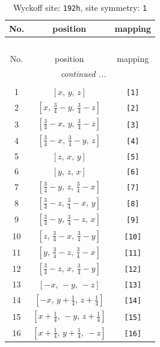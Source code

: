 \documentclass[fleqn,8pt]{jsarticle}
\begin{document}
\begin{longtable}{ccc}
\caption{Wyckoff site: {\tt 192h}, site symmetry: {\tt 1}}
 \\
 \hline \hline
No. & position & mapping \\ \hline \endfirsthead

\multicolumn{2}{l}{\tablename\ \thetable{}} \\
 \hline \hline
No. & position & mapping \\ \hline \endhead

 \hline \hline
\multicolumn{2}{r}{\footnotesize\it continued ...} \\ \endfoot

 \hline \hline
\multicolumn{2}{r}{} \\ \endlastfoot

1 & $\left[ x,\, y,\, z \right]$ & {\tt [1]} \\ \hline
2 & $\left[ x,\, \frac{3}{4} - y,\, \frac{3}{4} - z \right]$ & {\tt [2]} \\ \hline
3 & $\left[ \frac{3}{4} - x,\, y,\, \frac{3}{4} - z \right]$ & {\tt [3]} \\ \hline
4 & $\left[ \frac{3}{4} - x,\, \frac{3}{4} - y,\, z \right]$ & {\tt [4]} \\ \hline
5 & $\left[ z,\, x,\, y \right]$ & {\tt [5]} \\ \hline
6 & $\left[ y,\, z,\, x \right]$ & {\tt [6]} \\ \hline
7 & $\left[ \frac{3}{4} - y,\, z,\, \frac{3}{4} - x \right]$ & {\tt [7]} \\ \hline
8 & $\left[ \frac{3}{4} - z,\, \frac{3}{4} - x,\, y \right]$ & {\tt [8]} \\ \hline
9 & $\left[ \frac{3}{4} - y,\, \frac{3}{4} - z,\, x \right]$ & {\tt [9]} \\ \hline
10 & $\left[ z,\, \frac{3}{4} - x,\, \frac{3}{4} - y \right]$ & {\tt [10]} \\ \hline
11 & $\left[ y,\, \frac{3}{4} - z,\, \frac{3}{4} - x \right]$ & {\tt [11]} \\ \hline
12 & $\left[ \frac{3}{4} - z,\, x,\, \frac{3}{4} - y \right]$ & {\tt [12]} \\ \hline
13 & $\left[ - x,\, - y,\, - z \right]$ & {\tt [13]} \\ \hline
14 & $\left[ - x,\, y + \frac{1}{4},\, z + \frac{1}{4} \right]$ & {\tt [14]} \\ \hline
15 & $\left[ x + \frac{1}{4},\, - y,\, z + \frac{1}{4} \right]$ & {\tt [15]} \\ \hline
16 & $\left[ x + \frac{1}{4},\, y + \frac{1}{4},\, - z \right]$ & {\tt [16]} \\ \hline

\end{longtable}
\end{document}
